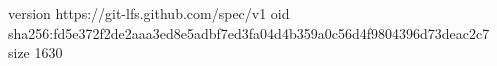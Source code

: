 version https://git-lfs.github.com/spec/v1
oid sha256:fd5e372f2de2aaa3ed8e5adbf7ed3fa04d4b359a0c56d4f9804396d73deac2c7
size 1630
